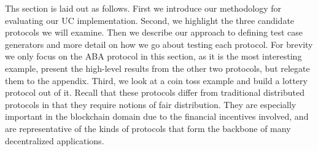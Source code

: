 Ths section is laid out as follows. First we introduce our methodology for
evaluating our UC implementation. Second, we highlight the three candidate
protocols we will examine. Then we describe our approach to defining test case
generators and more detail on how we go about testing each protocol. For
brevity we only focus on the ABA protocol in this section, as it is the most
interesting example, present the high-level results from the other two
protocols, but relegate them to the appendix.  Third, we look at a coin toss
example and build a lottery protocol out of it.  Recall that these protocols
differ from traditional distributed protocols in that they require notions of
fair distribution.  They are especially important in the blockchain domain due
to the financial incentives involved, and are representative of the kinds of
protocols that form the backbone of many decentralized applications.


